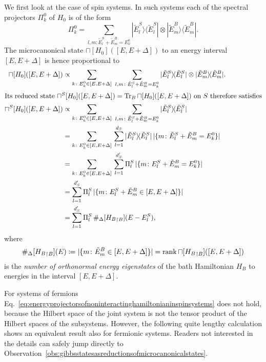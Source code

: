 \documentclass[a4paper,12pt,listof=totoc,index=totoc,bibliography=totoc,headsepline=false,headings=normal,BCOR16.153846mm,DIV12,headinclude,twoside,cleardoublepage=empty,numbers=noenddot,final]{scrreprt}
\theoremstyle{mystyle}
\numberwithin{equation}{section}
\numberwithin{figure}{section}
\numberwithin{lemma}{section}
\numberwithin{theorem}{section}
\numberwithin{corollary}{section}
\numberwithin{definition}{section}
\numberwithin{conjecture}{section}
\numberwithin{observation}{section}
\newcommand{\+}{\mkern2mu}
\newcommand{\coloneqq}{\mathrel{\vcentcolon\mkern-1.2mu=}} %
\newcommand{\texteqref}[1]{Eq.~\eqref{#1}}
\newcommand{\oftype}{\colon}
\newcommand{\suchthat}{\colon}
\renewcommand{\H}{H}
\newcommand{\rhomc}{{\sqcap}}
\newcommand{\bra}[1]{\langle #1|}
\newcommand{\ket}[1]{|#1\rangle}
\newcommand{\ketbra}[2]{\ket{#1}\!\bra{#2}}
\newcommand{\trunc}[2]{{#1}_{\upharpoonright \mathnormal{#2}}}
\DeclareMathOperator{\1}{\mathds{1}}
\DeclareMathOperator{\Tr}{Tr}
\DeclareMathOperator{\rank}{rank}
\begin{document}
We first look at the case of spin systems.
In such systems each of the spectral projectors $\Pi^0_k$ of $\H_0$ is of the form 
\begin{equation}
  \Pi^0_k = \sum_{l,m\suchthat \tilde E^S_l+\tilde E^B_m=E^0_k} \ketbra{\tilde E^S_l}{\tilde E^S_l} \otimes \ketbra{\tilde E^B_m}{\tilde E^B_m} . \label{eq:energyprojectorsofnoninteractinghamiltonianinspinsystems}
\end{equation}
The microcanonical state $\rhomc[\H_0]([E,E+\Delta])$ to an energy interval $[E,E+\Delta]$ is hence proportional to
\begin{align}
  \rhomc[\H_0]([E,E+\Delta]) &\propto \sum_{k\suchthat E^0_k \in [E,E+\Delta]}\ \sum_{l,m\suchthat \tilde E^S_l+\tilde E^B_m=E^0_k} \ketbra{\tilde E^S_l}{\tilde E^S_l} \otimes \ketbra{\tilde E^B_m}{\tilde E^B_m} . \label{eq:firstequalityinthecountingargumentforspins}\\
  \intertext{Its reduced state $\rhomc^S[\H_0]([E,E+\Delta]) = \Tr_B \rhomc[\H_0]([E,E+\Delta])$ on $S$ therefore satisfies}
  \rhomc^S[\H_0]([E,E+\Delta]) &\propto \sum_{k\suchthat E^0_k \in [E,E+\Delta]}\ \sum_{l,m\suchthat \tilde E^S_l+\tilde  E^B_m=E^0_k} \ketbra{\tilde E^S_l}{\tilde E^S_l} \\
  &= \sum_{k\suchthat E^0_k \in [E,E+\Delta]}\, \sum_{l=1}^{d_S} \ketbra{\tilde E^S_l}{\tilde E^S_l} \, |\{m\oftype \tilde E^S_l+\tilde E^B_m=E^0_k \}| \\
  &= \sum_{k\suchthat E^0_k \in [E,E+\Delta]}\, \sum_{l=1}^{d_S'} \Pi^S_l \, |\{m\oftype E^S_l+\tilde E^B_m=E^0_k \}| \\
  &= \sum_{l=1}^{d_S'} \Pi^S_l \, |\{m\oftype E^S_l+\tilde E^B_m \in [E,E+\Delta] \}| \\
  &= \sum_{l=1}^{d_S'} \Pi^S_l \, \#_\Delta[\trunc{\H_B}B](E-E^S_l) ,
\end{align}
where 
\begin{equation}
  \#_\Delta[\trunc{\H_B}B](E) \coloneqq |\{m\oftype \tilde E^B_m \in [E,E+\Delta] \}| = \rank\rhomc[\trunc{\H_B}B]([E,E+\Delta])
\end{equation}
is the \emph{number of orthonormal energy eigenstates} of the bath Hamiltonian $\H_B$ to energies in the interval $[E,E+\Delta]$.

For systems of fermions \texteqref{eq:energyprojectorsofnoninteractinghamiltonianinspinsystems} does not hold, because the Hilbert space of the joint system is not the tensor product of the Hilbert spaces of the subsystems.
However, the following quite lengthy calculation shows an equivalent result also for fermionic systems.
Readers not interested in the details can safely jump directly to Observation~\ref{obs:gibbsstatesasreductionsofmicrocanonicalstates}.
\end{document}
